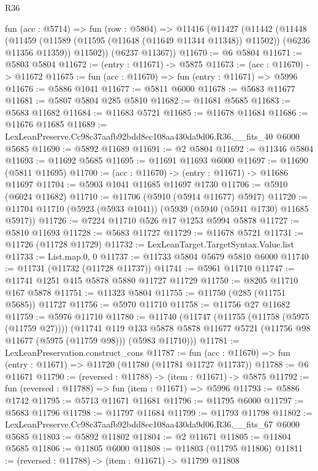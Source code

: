 \begin{lexlean}{R36}
\begin{coremodule}
  fun (acc : @5714) =>
  fun (row : @5804) =>
  @11416
    (@11427
      (@11442
        (@11448
          (@11459 (@11589 (@11595 (@11648 (@11649 @11344 @11348)) @11502)) (@6236 @11356 @11359))
          @11502))
      (@6237 @11367))
@11670 := @6 @5804
@11671 := @5803 @5804
@11672 := (entry : @11671) -> @5875
@11673 := (acc : @11670) -> @11672
@11675 := fun (acc : @11670) => fun (entry : @11671) => @5996
@11676 := @5886 @1041
@11677 := @5811 @6000
@11678 := @5683 @11677
@11681 := @5807 @5804 @285 @5810
@11682 := @11681 @5685
@11683 := @5683 @11682
@11684 := @11683 @5721
@11685 := @11678 @11684
@11686 := @11676 @11685
@11689 := LexLeanPreserve.Cc98c37aafb92bdd8ec108aa430da9d06.R36.__fits_40 @6000 @5685
@11690 := @5892 @11689
@11691 := @2 @5804
@11692 := @11346 @5804
@11693 := @11692 @5685
@11695 := @11691 @11693 @6000
@11697 := @11690 (@5811 @11695)
@11700 := (acc : @11670) -> (entry : @11671) -> @11686 @11697
@11704 := @5903 @1041 @11685 @11697 @1730
@11706 := @5910 (@6024 @11682)
@11710 := @11706 (@5910 (@5914 @11677) @5917)
@11720 := @11704 @11710 (@5923 (@5933 @1041)) (@5939 (@5940 (@5941 @1730) @11685 @5917))
@11726 := @7224 @11710 @526 @17 @1253 @5994 @5878
@11727 := @5810 @11693
@11728 := @5683 @11727
@11729 := @11678 @5721
@11731 := @11726 (@11728 @11729)
@11732 := LexLeanTarget.TargetSyntax.Value.list
@11733 := List.map.{0, 0}
@11737 := @11733 @5804 @5679 @5810 @6000
@11740 := @11731 (@11732 (@11728 @11737))
@11741 := @5961 @11710
@11747 := @11741 @1251 @415 @5878 @5880 @11727 @11729
@11750 := @8205 @11710 @167 @5878
@11751 := @11323 @5804
@11755 := @11750 (@285 (@11751 @5685)) @11727
@11756 := @5970 @11710
@11758 := @11756 @27 @11682
@11759 := @5976 @11710
@11780 := @11740
    (@11747
      (@11755 (@11758 (@5975 (@11759 @27))))
      (@11741
        @119
        @133
        @5878
        @5878
        @11677
        @5721
        (@11756 @98 @11677 (@5975 (@11759 @98)))
        (@5983 @11710)))
@11781 := LexLeanPreservation.construct_cons
@11787 := fun (acc : @11670) => fun (entry : @11671) => @11720 (@11780 (@11781 @11727 @11737))
@11788 := @6 @11671
@11790 := (reversed : @11788) -> (item : @11671) -> @5875
@11792 := fun (reversed : @11788) => fun (item : @11671) => @5996
@11793 := @5886 @1742
@11795 := @5713 @11671 @11681
@11796 := @11795 @6000
@11797 := @5683 @11796
@11798 := @11797 @11684
@11799 := @11793 @11798
@11802 := LexLeanPreserve.Cc98c37aafb92bdd8ec108aa430da9d06.R36.__fits_67 @6000 @5685
@11803 := @5892 @11802
@11804 := @2 @11671
@11805 := @11804 @5685
@11806 := @11805 @6000
@11808 := @11803 (@11795 @11806)
@11811 := (reversed : @11788) -> (item : @11671) -> @11799 @11808

\end{coremodule}
\end{lexlean}
